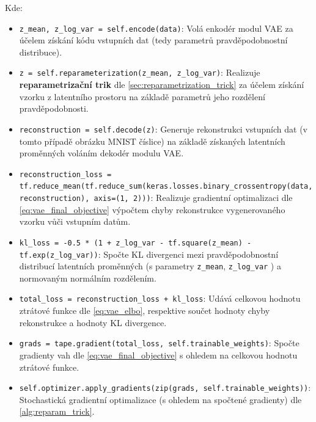 Kde:
\begin{itemize}
    \item \lstinline{z_mean, z_log_var = self.encode(data)}: Volá enkodér modul VAE za účelem získání kódu vstupních dat (tedy parametrů pravděpodobnostní distribuce).
    \item \lstinline{z = self.reparameterization(z_mean, z_log_var)}: Realizuje \textbf{reparametrizační trik} dle \autoref{sec:reparametrization_trick} za účelem získání vzorku z latentního prostoru na základě parametrů jeho rozdělení pravděpodobnosti.
    \item \lstinline{reconstruction = self.decode(z)}: Generuje rekonstrukci vstupních dat (v tomto případě obrázku MNIST číslice) na základě získaných latentních proměnných voláním dekodér modulu VAE.
    \item \lstinline{reconstruction_loss = tf.reduce_mean(tf.reduce_sum(keras.losses.binary_crossentropy(data, reconstruction), axis=(1, 2)))}: Realizuje gradientní optimalizaci dle \autoref{eq:vae_final_objective} výpočtem chyby rekonstrukce vygenerovaného vzorku vůči vstupním datům.
    \item \lstinline{kl_loss = -0.5 * (1 + z_log_var - tf.square(z_mean) - tf.exp(z_log_var))}: Spočte KL divergenci mezi pravděpodobnostní distribucí latentních proměnných (s parametry \lstinline{z_mean}, \lstinline{z_log_var} ) a normovaným normálním rozdělením.
    \item \lstinline{total_loss = reconstruction_loss + kl_loss}: Udává celkovou hodnotu ztrátové funkce dle \autoref{eq:vae_elbo}, respektive součet hodnoty chyby rekonstrukce a hodnoty KL divergence.
    \item \lstinline{grads = tape.gradient(total_loss, self.trainable_weights)}: Spočte gradienty vah dle \autoref{eq:vae_final_objective} s ohledem na celkovou hodnotu ztrátové funkce.
    \item \lstinline{self.optimizer.apply_gradients(zip(grads, self.trainable_weights))}: Stochastická gradientní optimalizace (s ohledem na spočtené gradienty) dle \autoref{alg:reparam_trick}.
\end{itemize}


